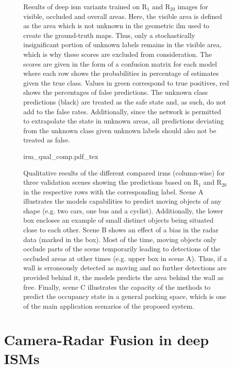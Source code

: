 \begin{figure}[H]
	\caption{\label{tab:deep_ism_r20_results}Results of deep \gls{ism} variants trained on R$_1$ and R$_{20}$ images for visible, occluded and overall areas. Here, the visible area is defined as the area which is not unknown in the geometric \gls{ilm} used to create the ground-truth maps. Thus, only a stochastically insignificant portion of unknown labels remains in the visible area, which is why these scores are excluded from consideration. The scores are given in the form of a confusion matrix for each model where each row shows the probabilities in percentage of estimates given the true class. Values in green correspond to true positives, red shows the percentages of false predictions. The unknown class predictions (black) are treated as the safe state and, as such, do not add to the false rates. Additionally, since the network is permitted to extrapolate the state in unknown areas, all predictions deviating from the unknown class given unknown labels should also not be treated as false.}
\end{figure} 
\begin{figure}[H]
	\begin{center}
		{irm_qual_comp.pdf_tex}
		\caption{\label{fig:irm_qual_comp}Qualitative results of the different compared \gls{irm}s (column-wise) for three validation scenes showing the predictions based on R$_1$ and R$_{20}$ in the respective rows with the corresponding label. Scene A illustrates the models capabilities to predict moving objects of any shape (e.g. two cars, one bus and a cyclist). Additionally, the lower box encloses an example of small distinct objects being situated close to each other. Scene B shows an effect of a bias in the radar data (marked in the box). Most of the time, moving objects only occlude parts of the scene temporarily leading to detections of the occluded areas at other times (e.g. upper box in scene A). Thus, if a wall is erroneously detected as moving and no further detections are provided behind it, the models predicts the area behind the wall as free. Finally, scene C illustrates the capacity of the methods to predict the occupancy state in a general parking space, which is one of the main application scenarios of the proposed system.}
	\end{center}
\end{figure}
%
\section{Camera-Radar Fusion in deep ISMs}
\label{sec:cam_radar_fusion_in_deep_isms}
%
